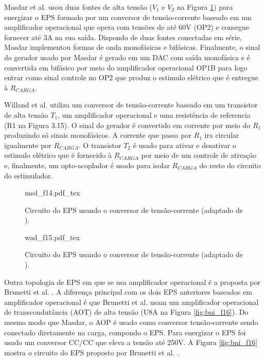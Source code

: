 Masdar et al. \cite{Masdar2013} usou duas fontes de alta tensão ($V_{1}$ e $V_{2}$ na Figura \ref{fig:msd_f14}) para energizar o \acrshort{EPS} formado por um conversor de tensão-corrente baseado em um amplificador operacional que opera com tensões de até 60V (OP2) e consegue fornecer até 3A na sua saída. Dispondo de duas fontes conectadas em série, Masdar implementou formas de onda monofásicas e bifásicas. Finalmente, o sinal do gerador usado por Masdar é gerado em um \acrshort{DAC} com saída monofásica e é convertida em bifásico por meio do amplificador operacional OP1B para logo entrar como sinal controle no OP2 que produz o estimulo elétrico que é entregue à $R_{CARGA}$.

Willand et al. \cite{Willand2008} utiliza um conversor de tensão-corrente baseado em um transistor de alta tensão $T_{1}$, um amplificador operacional e uma resistência de referencia (R1 na Figura 3.15). O sinal do gerador é convertido em corrente por meio do $R_{1}$ produzindo só sinais monofásicos. A corrente que passa por $R_{1}$ ira circular igualmente por $R_{CARGA}$. O transistor $T_{2}$ é usado para ativar e desativar o estimulo elétrico que é fornecido à $R_{CARGA}$ por meio de um controle de ativação e, finalmente, um opto-acoplador é usado para isolar $R_{CARGA}$ do resto do circuito do estimulador.

\vspace{0.3cm}

\begin{figure}[h]
    \centering %
    \small %
    \def\svgwidth{0.9
    \columnwidth}%
    {msd_f14.pdf_tex}
    \caption{Circuito do EPS usando o conversor de tensão-corrente (adaptado de \cite{Masdar2012}).}
    \label{fig:msd_f14}
\end{figure}

\begin{figure}
    \centering %
    \small %
    \def\svgwidth{0.45
    \columnwidth}%
    {wad_f15.pdf_tex}
    \caption{Circuito do EPS usando o conversor de tensão-corrente (adaptado de \cite{Willand2008}).}
    \label{fig:wad_f15}
\end{figure}

Outra topologia de \acrshort{EPS} em que se usa amplificador operacional é a proposta por Brunetti et al. \cite{Brunetti2011}. A diferença principal com os dois \acrshort{EPS} anteriores baseados em amplificador operacional é que Brunetti et al. usam um amplificador operacional de transcondutância (\acrshort{AOT}) de alta tensão (U8A na Figura \ref{fig:bni_f16}). Do mesmo modo que Masdar, o \acrshort{AOP} é usado como conversor tensão-corrente sendo conectado diretamente na carga, compondo o \acrshort{EPS}. Para energizar o \acrshort{EPS} foi usado um conversor CC/CC que eleva a tensão até 250V. A Figura \ref{fig:bni_f16} mostra o circuito do \acrshort{EPS} proposto por Brunetti et al. \cite{Brunetti2011}.

